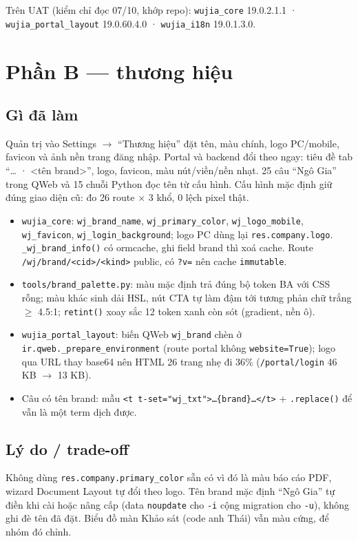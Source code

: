 Trên UAT (kiểm chỉ đọc 07/10, khớp repo): \texttt{wujia\_core} 19.0.2.1.1 · \texttt{wujia\_portal\_layout} 19.0.60.4.0 ·
\texttt{wujia\_i18n} 19.0.1.3.0.

\section{Phần B --- thương hiệu}

\subsection*{Gì đã làm}
Quản trị vào Settings $\to$ ``Thương hiệu'' đặt tên, màu chính, logo PC/mobile, favicon và ảnh nền trang đăng nhập. Portal và
backend đổi theo ngay: tiêu đề tab ``\ldots{} · <tên brand>'', logo, favicon, màu nút/viền/nền nhạt. 25 câu ``Ngô Gia'' trong
QWeb và 15 chuỗi Python đọc tên từ cấu hình. Cấu hình mặc định giữ đúng giao diện cũ: đo 26 route $\times$ 3 khổ, 0 lệch pixel thật.

\begin{itemize}[nosep]
\item \texttt{wujia\_core}: \texttt{wj\_brand\_name}, \texttt{wj\_primary\_color}, \texttt{wj\_logo\_mobile}, \texttt{wj\_favicon},
  \texttt{wj\_login\_background}; logo PC dùng lại \texttt{res.company.logo}. \texttt{\_wj\_brand\_info()} có ormcache, ghi field brand
  thì xoá cache. Route \texttt{/wj/brand/<cid>/<kind>} public, có \texttt{?v=} nên cache \texttt{immutable}.
\item \texttt{tools/brand\_palette.py}: màu mặc định trả đúng bộ token BA với CSS rỗng; màu khác sinh dải HSL, nút CTA tự làm đậm tới
  tương phản chữ trắng $\geq$ 4.5:1; \texttt{retint()} xoay sắc 12 token xanh còn sót (gradient, nền ô).
\item \texttt{wujia\_portal\_layout}: biến QWeb \texttt{wj\_brand} chèn ở \texttt{ir.qweb.\_prepare\_environment} (route portal không
  \texttt{website=True}); logo qua URL thay base64 nên HTML 26 trang nhẹ đi 36\% (\texttt{/portal/login} 46 KB $\to$ 13 KB).
\item Câu có tên brand: mẫu \texttt{<t t-set="wj\_txt">\ldots\{brand\}\ldots</t>} + \texttt{.replace()} để vẫn là một term dịch được.
\end{itemize}

\subsection*{Lý do / trade-off}
Không dùng \texttt{res.company.primary\_color} sẵn có vì đó là màu báo cáo PDF, wizard Document Layout tự đổi theo logo. Tên brand
mặc định ``Ngô Gia'' tự điền khi cài hoặc nâng cấp (data \texttt{noupdate} cho \texttt{-i} cộng migration cho \texttt{-u}), không
ghi đè tên đã đặt. Biểu đồ màn Khảo sát (code anh Thái) vẫn màu cứng, để nhóm đó chỉnh.

